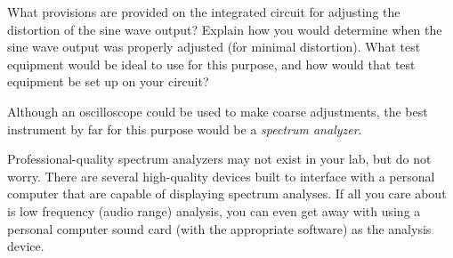 

What provisions are provided on the integrated circuit for adjusting the distortion of the sine wave output?  Explain how you would determine when the sine wave output was properly adjusted (for minimal distortion).  What test equipment would be ideal to use for this purpose, and how would that test equipment be set up on your circuit?







Although an oscilloscope could be used to make coarse adjustments, the best instrument by far for this purpose would be a {\it spectrum analyzer}.







Professional-quality spectrum analyzers may not exist in your lab, but do not worry.  There are several high-quality devices built to interface with a personal computer that are capable of displaying spectrum analyses.  If all you care about is low frequency (audio range) analysis, you can even get away with using a personal computer sound card (with the appropriate software) as the analysis device.



